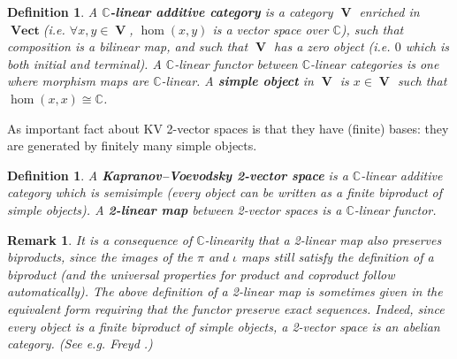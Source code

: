 \documentclass[10pt]{amsart}
\numberwithin{theorem}{subsection}
\newtheorem{definition}[theorem]{Definition}
\newtheorem{varremark}[theorem]{Remark}
\newenvironment{remark}{\begin{varremark}\em}{\em\end{varremark}}
\newcommand{\opname}[1]{\operatorname{#1}}
\newcommand{\catname}[1]{\boldsymbol{\opname{{#1}}}}
\newcommand{\V}{\catname{Vect}}
\begin{document}
\begin{definition} A \textbf{$\mathbb{C}$-linear additive category}
is a category $\catname{V}$ enriched in $\V$(i.e. $\forall x, y \in \catname{V}$, $\hom(x,y)$ is a vector space
over $\mathbb{C}$), such that composition is a bilinear map, and such that $\catname{V}$ has a zero object (i.e. $0$ which is both initial and terminal).  A
$\mathbb{C}$-linear functor between $\mathbb{C}$-linear categories
is one where morphism maps are $\mathbb{C}$-linear.  A \textbf{simple object} in $\catname{V}$ is $x \in \catname{V}$
such that $\hom(x,x) \cong \mathbb{C}$.
\end{definition}

As important fact about KV 2-vector spaces is that they have
(finite) bases: they are generated by finitely many simple objects.

\begin{definition} A \textbf{Kapranov--Voevodsky 2-vector space} is a
$\mathbb{C}$-linear additive category which is semisimple (every object can be
written as a finite biproduct of simple objects).  A \textbf{2-linear map} between
2-vector spaces is a $\mathbb{C}$-linear functor.
\end{definition}

\begin{remark}It is a consequence of $\mathbb{C}$-linearity that a 2-linear map also preserves biproducts, since the images of the $\pi$ and $\iota$ maps still satisfy the definition of a biproduct (and the universal properties for product and coproduct follow automatically).  The above definition of a
2-linear map is sometimes given in the equivalent form requiring that
the functor preserve exact sequences.  Indeed, since every object is a
finite biproduct of simple objects, a 2-vector space is an
\textit{abelian} category.  (See e.g. Freyd \cite{freyd}.)
\end{remark}

\end{document}
